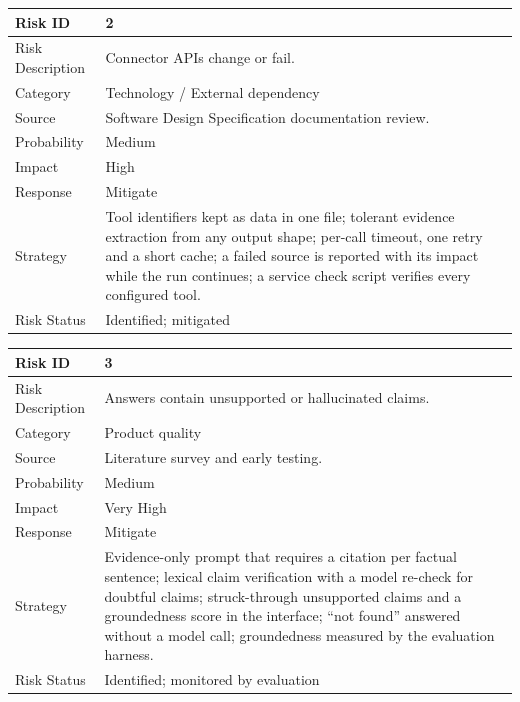 \begin{table}[!htbp]
\begin{center}
\def\arraystretch{1.5}
\begin{tabularx}{\textwidth}{| l | X |}
\hline
Risk ID	& 2 \\ \hline
Risk Description	& Connector APIs change or fail. \\ \hline
Category	& Technology / External dependency \\ \hline
Source	& Software Design Specification documentation review. \\ \hline
Probability	& Medium \\ \hline
Impact	& High \\ \hline
Response	& Mitigate \\ \hline
Strategy	& Tool identifiers kept as data in one file; tolerant evidence extraction from any output shape; per-call timeout, one retry and a short cache; a failed source is reported with its impact while the run continues; a service check script verifies every configured tool. \\ \hline
Risk Status	& Identified; mitigated \\ \hline
\end{tabularx}
\end{center}
\label{tab:risk2}
\end{table}

\begin{table}[!htbp]
\begin{center}
\def\arraystretch{1.5}
\begin{tabularx}{\textwidth}{| l | X |}
\hline
Risk ID	& 3 \\ \hline
Risk Description	& Answers contain unsupported or hallucinated claims. \\ \hline
Category	& Product quality \\ \hline
Source	& Literature survey and early testing. \\ \hline
Probability	& Medium \\ \hline
Impact	& Very High \\ \hline
Response	& Mitigate \\ \hline
Strategy	& Evidence-only prompt that requires a citation per factual sentence; lexical claim verification with a model re-check for doubtful claims; struck-through unsupported claims and a groundedness score in the interface; ``not found'' answered without a model call; groundedness measured by the evaluation harness. \\ \hline
Risk Status	& Identified; monitored by evaluation \\ \hline
\end{tabularx}
\end{center}
\label{tab:risk3}
\end{table}

